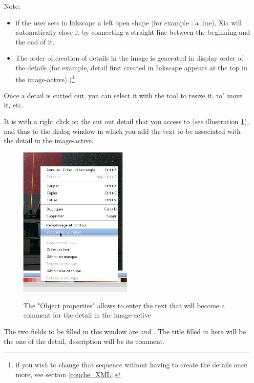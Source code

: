 Note:
\begin{itemize}
 \item if the user sets in Inkscape a left open shape (for
example : a line), Xia will automatically close it  by connecting a 
 straight line between the beginning and the end of it.
 \item The order of creation of details in the image is generated in display 
order of the details (for example, detail first created in
Inkscape appears at the top in the image-active).)\footnote{if you wish to 
change that sequence without having to create the details once more, see 
section 
\ref{couche_XML}.}
\end{itemize}

Once a detail is cutted out, you can select it with the tool  
 to resize it, to" 
move it, etc.

It is with a right click on the cut out detail that you access to 
 (see illustration 
\ref{proprietes_objet}), and 
thus to the dialog window in which you add the text to be associated with the 
detail in the image-active.

\begin{figure}[htp]
 \centering
 \caption{The "Object properties" allows to enter the text that will become a 
 comment for the detail in the image-active}
 \includegraphics[width=0.5\textwidth]{./images/proprietes_objet}
 \label{proprietes_objet}
\end{figure}

The two fields to be filled in this window are  and 
.  The title filled in here will be the one of the detail, 
description will be its comment.

